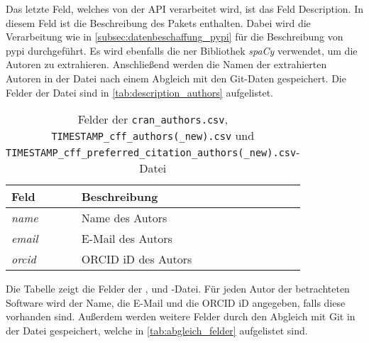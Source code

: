 Das letzte Feld, welches von der API verarbeitet wird, ist das Feld \glqq Description\grqq{}.
In diesem Feld ist die Beschreibung des Pakets enthalten.
Dabei wird die Verarbeitung wie in \autoref{subsec:datenbeschaffung_pypi} für die Beschreibung von \gls{pypi} durchgeführt.
Es wird ebenfalls die \gls{ner} Bibliothek \emph{spaCy} verwendet, um die Autoren zu extrahieren.
Anschließend werden die Namen der extrahierten Autoren in der Datei  nach einem Abgleich mit den Git-Daten gespeichert.
Die Felder der Datei sind in \autoref{tab:description_authors} aufgelistet.

\begin{table}
    \begin{tabularx}{\textwidth}{XL{10.2cm}}
        \toprule
        \textbf{Feld} & \textbf{Beschreibung} \\ \midrule
        \emph{name}   & Name des Autors       \\
        \emph{email}  & E-Mail des Autors     \\
        \emph{orcid}  & ORCID iD des Autors   \\
        \bottomrule
    \end{tabularx}
    \caption{Felder der \texttt{cran\_authors.csv}, \texttt{TIMESTAMP\_cff\_authors(\_new).csv} und \texttt{TIMESTAMP\_cff\_preferred\_citation\_authors(\_new).csv}-Datei}
    \label{tab:cran_authors}
    \small
    Die Tabelle zeigt die Felder der ,  und -Datei. Für jeden Autor der betrachteten Software wird der Name, die E-Mail und die ORCID iD angegeben, falls diese vorhanden sind. Außerdem werden weitere Felder durch den Abgleich mit Git in der Datei gespeichert, welche in \autoref{tab:abgleich_felder} aufgelistet sind.
\end{table}
